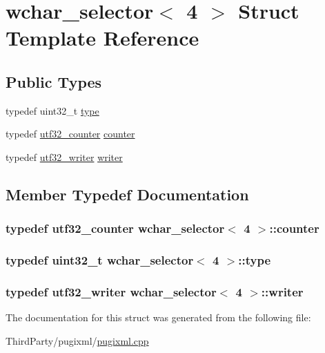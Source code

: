 \hypertarget{structwchar__selector_3_014_01_4}{\section{wchar\-\_\-selector$<$ 4 $>$ Struct Template Reference}
\label{structwchar__selector_3_014_01_4}
}
\subsection*{Public Types}
\begin{DoxyCompactItemize}
\item 
typedef uint32\-\_\-t \hyperlink{structwchar__selector_3_014_01_4_af45ac603ab6fefec66e5c29044b4eed6}{type}
\item 
typedef \hyperlink{structutf32__counter}{utf32\-\_\-counter} \hyperlink{structwchar__selector_3_014_01_4_a7d7c585ae0819660112b8c8683971b97}{counter}
\item 
typedef \hyperlink{structutf32__writer}{utf32\-\_\-writer} \hyperlink{structwchar__selector_3_014_01_4_a48042e7fe51c4661397ae7afe3905243}{writer}
\end{DoxyCompactItemize}


\subsection{Member Typedef Documentation}
\hypertarget{structwchar__selector_3_014_01_4_a7d7c585ae0819660112b8c8683971b97}{
\subsubsection[{counter}]{\setlength{\rightskip}{0pt plus 5cm}typedef {\bf utf32\-\_\-counter} {\bf wchar\-\_\-selector}$<$ 4 $>$\-::{\bf counter}}}\label{structwchar__selector_3_014_01_4_a7d7c585ae0819660112b8c8683971b97}
\hypertarget{structwchar__selector_3_014_01_4_af45ac603ab6fefec66e5c29044b4eed6}{
\subsubsection[{type}]{\setlength{\rightskip}{0pt plus 5cm}typedef uint32\-\_\-t {\bf wchar\-\_\-selector}$<$ 4 $>$\-::{\bf type}}}\label{structwchar__selector_3_014_01_4_af45ac603ab6fefec66e5c29044b4eed6}
\hypertarget{structwchar__selector_3_014_01_4_a48042e7fe51c4661397ae7afe3905243}{
\subsubsection[{writer}]{\setlength{\rightskip}{0pt plus 5cm}typedef {\bf utf32\-\_\-writer} {\bf wchar\-\_\-selector}$<$ 4 $>$\-::{\bf writer}}}\label{structwchar__selector_3_014_01_4_a48042e7fe51c4661397ae7afe3905243}


The documentation for this struct was generated from the following file\-:\begin{DoxyCompactItemize}
\item 
Third\-Party/pugixml/\hyperlink{pugixml_8cpp}{pugixml.\-cpp}\end{DoxyCompactItemize}
